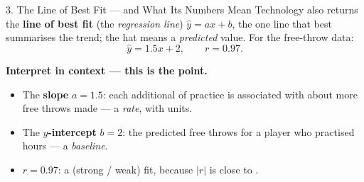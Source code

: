 \documentclass[10pt]{article}
\newcommand{\lgrid}[4]{%
  \draw[step=1, linegray!40, very thin] (#1,#3) grid (#2,#4);
  \draw[->, semithick, charcoal] (#1,0)--(#2,0) node[below right, font=\scriptsize]{$x$};
  \draw[->, semithick, charcoal] (0,#3)--(0,#4) node[left, font=\scriptsize]{$y$};}
\newcommand{\dpt}[2]{\fill[navy] (#1,#2) circle (2.6pt);}
\newcommand{\ftdata}{\dpt{1}{4}\dpt{2}{4}\dpt{3}{7}\dpt{4}{7}\dpt{5}{11}\dpt{6}{11}\dpt{7}{12}\dpt{8}{14}}
\begin{document}
\boxguard[12]
\begin{notesbox}{3. The Line of Best Fit --- and What Its Numbers Mean}
Technology also returns the \textbf{line of best fit} (the \emph{regression line}) $\hat y=ax+b$,
the one line that best summarises the trend; the hat means a \emph{predicted} value. For the
free-throw data:
\[ \hat y = 1.5x + 2, \qquad r = 0.97. \]
\begin{center}
\begin{minipage}[c]{0.40\linewidth}\centering
{}
\end{minipage}\hfill
\begin{minipage}[c]{0.56\linewidth}
\textbf{Interpret in context --- this is the point.}
\begin{itemize}[leftmargin=1.5em, itemsep=2pt]
  \item The \textbf{slope} $a=1.5$: each additional \blank{1.2cm} of practice is associated
        with about \blank{0.9cm} more free throws made --- a \emph{rate}, with units.
  \item The \textbf{$y$-intercept} $b=2$: the predicted free throws for a player who practised
        \blank{0.9cm} hours --- a \emph{baseline}.
  \item $r=0.97$: a \blank{1.2cm} (strong / weak) fit, because $|r|$ is close to \blank{0.8cm}.
\end{itemize}
\end{minipage}
\end{center}
\end{notesbox}
\end{document}
